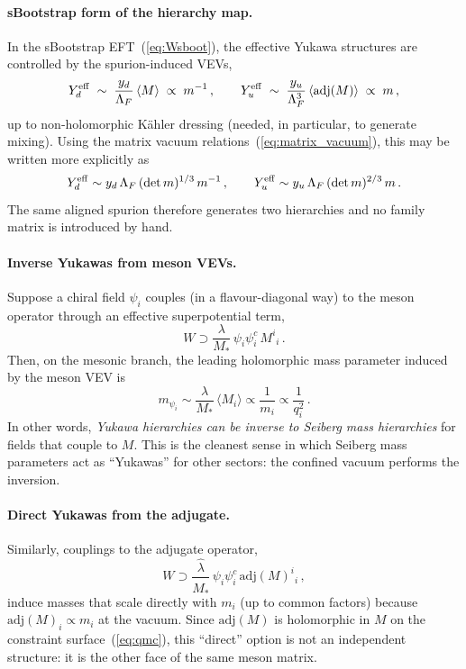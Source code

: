 \documentclass[11pt,a4paper]{article}
\newcommand{\adj}{\mathrm{adj}}
\begin{document}
\paragraph{sBootstrap form of the hierarchy map.}
In the sBootstrap EFT~(\ref{eq:Wsboot}), the effective Yukawa structures are
controlled by the spurion-induced VEVs,
\begin{equation}
  Y_d^{\rm eff}\;\sim\;\frac{y_d}{\Lambda_F}\,\langle M\rangle \;\propto\; m^{-1}\,,
  \qquad
  Y_u^{\rm eff}\;\sim\;\frac{y_u}{\Lambda_F^3}\,\langle \adj(M)\rangle \;\propto\; m\,,
  \label{eq:Yeff_map}
\end{equation}
up to non-holomorphic K\"ahler dressing (needed, in particular, to generate
mixing).  Using the matrix vacuum relations~(\ref{eq:matrix_vacuum}), this may
be written more explicitly as
\begin{equation}
  Y_d^{\rm eff}\sim
  y_d\,\Lambda_F\,(\det m)^{1/3}\,m^{-1}\,,
  \qquad
  Y_u^{\rm eff}\sim
  y_u\,\Lambda_F\,(\det m)^{2/3}\,m\,.
  \label{eq:Yeff_map_explicit}
\end{equation}
The same aligned spurion therefore generates two hierarchies and no family
matrix is introduced by hand.

\paragraph{Inverse Yukawas from meson VEVs.}
Suppose a chiral field $\psi_i$ couples (in a flavour-diagonal way) to the
meson operator through an effective superpotential term,
\begin{equation}
  W \supset \frac{\lambda}{M_*}\,\psi_i\psi^c_i\,M^i{}_i\,.
  \label{eq:yukawa_M}
\end{equation}
Then, on the mesonic branch, the leading holomorphic mass parameter induced by
the meson VEV is
\begin{equation}
  m_{\psi_i}\sim \frac{\lambda}{M_*}\,\langle M_i\rangle
  \propto \frac{1}{m_i}
  \propto \frac{1}{q_i^2}\,.
  \label{eq:inverse_yukawa}
\end{equation}
In other words, \emph{Yukawa hierarchies can be inverse to Seiberg mass
hierarchies} for fields that couple to $M$.
This is the cleanest sense in which Seiberg mass parameters act as
``Yukawas'' for other sectors: the confined vacuum performs the inversion.

\paragraph{Direct Yukawas from the adjugate.}
Similarly, couplings to the adjugate operator,
\begin{equation}
  W \supset \frac{\hat\lambda}{\hat M_*}\,\psi_i\psi^c_i\,\adj(M)^i{}_i\,,
  \label{eq:yukawa_adj}
\end{equation}
induce masses that scale directly with $m_i$ (up to common factors) because
$\adj(M)_i\propto m_i$ at the vacuum.  Since $\adj(M)$ is holomorphic in $M$
on the constraint surface~(\ref{eq:qmc}), this ``direct'' option is not an
independent structure: it is the other face of the same meson matrix.
\end{document}
